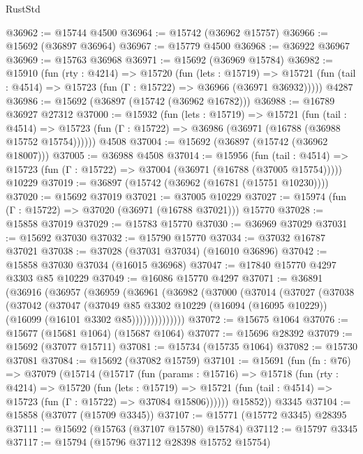\begin{lexlean}{RustStd}
\begin{coremodule}
@36962 := @15744 @4500
@36964 := @15742 (@36962 @15757)
@36966 := @15692 (@36897 @36964)
@36967 := @15779 @4500
@36968 := @36922 @36967
@36969 := @15763 @36968
@36971 := @15692 (@36969 @15784)
@36982 := @15910
    (fun (rty : @4214) =>
    @15720
      (fun (lets : @15719) =>
      @15721 (fun (tail : @4514) => @15723 (fun (Γ : @15722) => @36966 (@36971 @36932)))))
    @4287
@36986 := @15692 (@36897 (@15742 (@36962 @16782)))
@36988 := @16789 @36927 @27312
@37000 := @15932
    (fun (lets : @15719) =>
    @15721
      (fun (tail : @4514) =>
      @15723 (fun (Γ : @15722) => @36986 (@36971 (@16788 (@36988 @15752 @15754))))))
    @4508
@37004 := @15692 (@36897 (@15742 (@36962 @18007)))
@37005 := @36988 @4508
@37014 := @15956
    (fun (tail : @4514) => @15723 (fun (Γ : @15722) => @37004 (@36971 (@16788 (@37005 @15754)))))
    @10229
@37019 := @36897 (@15742 (@36962 (@16781 (@15751 @10230))))
@37020 := @15692 @37019
@37021 := @37005 @10229
@37027 := @15974 (fun (Γ : @15722) => @37020 (@36971 (@16788 @37021))) @15770
@37028 := @15858 @37019
@37029 := @15783 @15770
@37030 := @36969 @37029
@37031 := @15692 @37030
@37032 := @15790 @15770
@37034 := @37032 @16787 @37021
@37038 := @37028 (@37031 @37034) (@16010 @36896)
@37042 := @15858 @37030 @37034 (@16015 @36968)
@37047 := @17840 @15770 @4297 @3303 @85 @10229
@37049 := @16086 @15770 @4297
@37071 := @36891
    (@36916
      (@36957
        (@36959
          (@36961
            (@36982
              (@37000
                (@37014
                  (@37027
                    (@37038
                      (@37042
                        (@37047
                          (@37049
                            @85
                            @3302
                            @10229
                            (@16094 (@16095 @10229))
                            (@16099 (@16101 @3302 @85))))))))))))))
@37072 := @15675 @1064
@37076 := @15677 (@15681 @1064) (@15687 @1064)
@37077 := @15696 @28392
@37079 := @15692 (@37077 @15711)
@37081 := @15734 (@15735 @1064)
@37082 := @15730 @37081
@37084 := @15692 (@37082 @15759)
@37101 := @15691
    (fun (fn : @76) =>
    @37079
      (@15714
        (@15717
          (fun (params : @15716) =>
          @15718
            (fun (rty : @4214) =>
            @15720
              (fun (lets : @15719) =>
              @15721 (fun (tail : @4514) => @15723 (fun (Γ : @15722) => @37084 @15806))))))
        @15852))
    @3345
@37104 := @15858 (@37077 (@15709 @3345))
@37107 := @15771 (@15772 @3345) @28395
@37111 := @15692 (@15763 (@37107 @15780) @15784)
@37112 := @15797 @3345
@37117 := @15794 (@15796 @37112 @28398 @15752 @15754)

\end{coremodule}
\end{lexlean}
